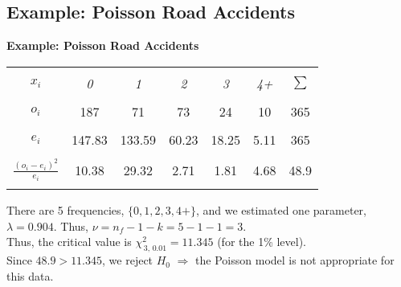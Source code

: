 \documentclass[compress]{beamer}        %
\makeatletter
\newcommand{\tcb}{\textcolor{beamer@blendedblue}}
\makeatother
\begin{document}
\subsection{Example: Poisson Road Accidents}
\begin{frame}{\bf \tcb{Example: Poisson Road Accidents}}\label{road}

\begin{center}
\begin{tabular}{|c|ccccc|c|}
\hline
&&&&&&\\[-0.3cm]
$x_i$      & \emph{0} & \emph{1} & \emph{2} & \emph{3} & \emph{4+} & $\sum$ \\[0.1cm]
\hline
&&&&&&\\[-0.3cm]
$o_i$ & 187 & 71 & 73 & 24 & 10 & 365\\[0.1cm]
\hline
&&&&&&\\[-0.3cm]
$e_i$ &  147.83 & 133.59 &  60.23 &  18.25 & 5.11 & 365\\[0.1cm]
\hline
&&&&&&\\[-0.3cm]
$\frac{(o_i-e_i)^2}{e_i}$ & 10.38 & 29.32 &  2.71 &  1.81 &  4.68 & 48.9
\\[0.1cm]
\hline
\multicolumn{7}{c}{}\\[-0.3cm]
\end{tabular}
\end{center}


There are 5 frequencies, $\{0,1,2,3,4+\}$, and we estimated one parameter, $\lambda = 0.904$. Thus, $\nu = n_{f} - 1 - k = 5 - 1 - 1 =3$.\\[0.4cm]

Thus, the critical value is $\chi^2_{\,3,\,0.01} = 11.345$ (for the 1\% level).\\[0.4cm]

Since $48.9 > 11.345$, we reject $H_0$ $\Rightarrow$ the Poisson model is not appropriate for this data.

\end{frame}
\end{document}
